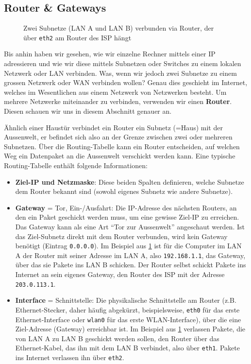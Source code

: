 \subsection{Router \& Gateways}
\begin{figure}[H]
	\centering
	
	\caption{Zwei Subnetze (\gls{LAN} A und \gls{LAN} B) verbunden via Router, der über \texttt{eth2} am Router des \gls{ISP} hängt}
	\label{fig:router-subnetze}
\end{figure}
Bis anhin haben wir gesehen, wie wir einzelne Rechner mittels einer \gls{IP} adressieren und wie wir diese mittels Subnetzen oder Switches zu einem lokalen Netzwerk oder \gls{LAN} verbinden. Was, wenn wir jedoch zwei Subnetze zu einem grossen Netzwerk oder \gls{WAN} verbinden wollen? Genau dies geschieht im Internet, welches im Wesentlichen aus einem Netzwerk von Netzwerken besteht. Um mehrere Netzwerke miteinander zu verbinden, verwenden wir einen \textbf{Router}. Diesen schauen wir uns in diesem Abschnitt genauer an.

Ähnlich einer Haustür verbindet ein Router ein Subnetz (=Haus) mit der Aussenwelt, er befindet sich also an der Grenze zwischen zwei oder mehreren Subnetzen. Über die Routing-Tabelle kann ein Router entscheiden, auf welchen Weg ein Datenpaket an die Aussenwelt verschickt werden kann. Eine typische Routing-Tabelle enthält folgende Informationen:

\begin{itemize}
	\item \textbf{Ziel-\gls{IP} und Netzmaske}: Diese beiden Spalten definieren, welche Subnetze dem Router bekannt sind (sowohl eigenes Subnetz wie andere Subnetze).
	\item \textbf{Gateway} = Tor, Ein-/Ausfahrt: Die \gls{IP}-Adresse des nächsten Routers, an den ein Paket geschickt werden muss, um eine gewisse Ziel-\gls{IP} zu erreichen. Das Gateway kann als eine Art \enquote{Tor zur Aussenwelt} angeschaut werden. Ist das Ziel-Subnetz direkt mit dem Router verbunden, wird kein Gateway benötigt (Eintrag \texttt{0.0.0.0}). Im Beispiel aus \cref{fig:router-subnetze} ist für die Computer im \gls{LAN} A der Router mit seiner Adresse im \gls{LAN} A, also \texttt{192.168.1.1}, das Gateway, über das sie Pakete ins \gls{LAN} B schicken. Der Router selbst schickt Pakete ins Internet an sein eigenes Gateway, den Router des \gls{ISP} mit der Adresse \texttt{203.0.113.1}.
	\item \textbf{Interface} = Schnittstelle: Die physikalische Schnittstelle am Router (z.B. Ethernet-Stecker, daher häufig abgekürzt, beispielsweise, \texttt{eth0} für das erste Ethernet-Interface oder \texttt{wlan0} für das erste \gls{WLAN}-Interface), über die eine Ziel-Adresse (Gateway) erreichbar ist. Im Beispiel aus \cref{fig:router-subnetze} verlassen Pakete, die von \gls{LAN} A zu \gls{LAN} B geschickt werden sollen, den Router über das Ethernet-Kabel, das ihn mit dem \gls{LAN} B verbindet, also über \texttt{eth1}. Pakete ins Internet verlassen ihn über \texttt{eth2}.
\end{itemize}

